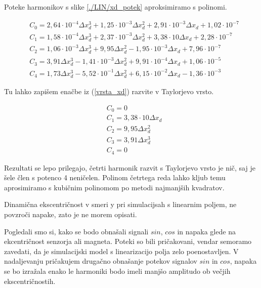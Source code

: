 
Poteke harmonikov s slike \ref{./LIN/xd_potek} aproksimiramo  s polinomi. 

\begin{eqnarray}
\label{nap_lin_xd}
&C_0 =2,64\cdot 10^{-4}\Delta x_d^{3}+1,25\cdot 10^{-3}\Delta x_d^{2}+2,91\cdot 10^{-3}\Delta x_d+1,02\cdot 10^{-7} \\
&C_1 =1,58\cdot 10^{-4}\Delta x_d^{3}+2,37\cdot 10^{-3}\Delta x_d^{2}+3,38\cdot 10\Delta x_d+2,28\cdot 10^{-7} \\     
&C_2 =1,06\cdot 10^{-3}\Delta x_d^{3}+9,95\Delta x_d^{2}-1,95\cdot 10^{-3}\Delta x_d+7,96\cdot 10^{-7} \\             
&C_3 =3,91\Delta x_d^{3}-1,41\cdot 10^{-3}\Delta x_d^{2}+9,91\cdot 10^{-4}\Delta x_d+1,06\cdot 10^{-5} \\               
&C_4 =1,73\Delta x_d^{3}-5,52\cdot 10^{-1}\Delta x_d^{2}+6,15\cdot 10^{-2}\Delta x_d-1,36\cdot 10^{-3}            
\end{eqnarray}

Tu lahko zapišem enačbe iz (\ref{vrsta_xd}) razvite v Taylorjevo vrsto.


\begin{eqnarray}
&C_0 =0\\
&C_1 =3,38\cdot 10\Delta x_d\\     
&C_2 =9,95\Delta x_d^{2}\\             
&C_3 =3,91\Delta x_d^{3}\\         
&C_4 =0            
\end{eqnarray}

Rezultati se lepo prilegajo, četrti harmonik razvit s Taylorjevo vrsto je nič, saj je šele člen s potenco 4 neničelen. Polinom četrtega reda lahko kljub temu aprosimiramo s kubičnim polinomom po metodi najmanjših kvadratov.

Dinamična ekscentričnost v smeri y pri simulacijsah s linearnim poljem, ne povzroči napake, zato je ne morem opisati.

Pogledali smo si, kako se bodo obnašali signali $sin$, $cos$ in napaka glede na ekcentričnost senzorja ali magneta. Poteki so bili pričakovani, vendar semoramo zavedati, da je simulacijski model s linearizacijo polja zelo poenostavljen. V nadaljevanju pričakujem drugačno obnašanje potekov signalov $sin$ in $cos$, napaka se bo izražala enako le harmoniki bodo imeli manjšo amplitudo ob večjih ekscentričnostih.


